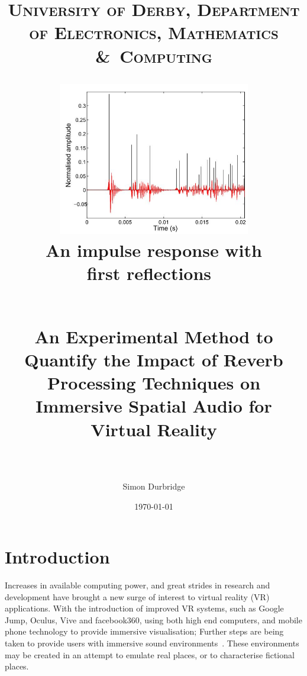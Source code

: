 \documentclass[paper=a4, fontsize=10pt, font=arial]{scrartcl} %
\title{	
\normalfont \normalsize 
\textsc{University of Derby, Department of Electronics, Mathematics \&\ Computing} \\ [25pt] %
\begin{figure}[H]
\centering
\includegraphics[width=0.75\textwidth]{impulseresponse.jpg}
\centering
\caption{An impulse response with first reflections~\cite{Mourik2013}}
\end{figure}
\horrule{0.5pt} \\[0.4cm] %
\huge An Experimental Method to Quantify the Impact of Reverb Processing Techniques on Immersive Spatial Audio for Virtual Reality \\ %
\horrule{2pt} \\[0.5cm] %
}
\author{Simon Durbridge} %
\date{\normalsize\today} %
\numberwithin{equation}{section} %
\numberwithin{figure}{section} %
\numberwithin{table}{section} %
\begin{document}
\maketitle %


\tableofcontents



\listoffigures

\newpage





\section{Introduction}

Increases in available computing power, and great strides in research and development have brought a new surge of interest to virtual reality (VR) applications. 
With the introduction of improved VR systems, such as Google Jump, Oculus, Vive and facebook360, using both high end computers, and mobile phone technology to provide immersive visualisation; Further steps are being taken to provide users with immersive sound environments~\cite{OculusCo41online}. 
These environments may be created in an  attempt to emulate real places, or to characterise fictional places.\par
\end{document}
